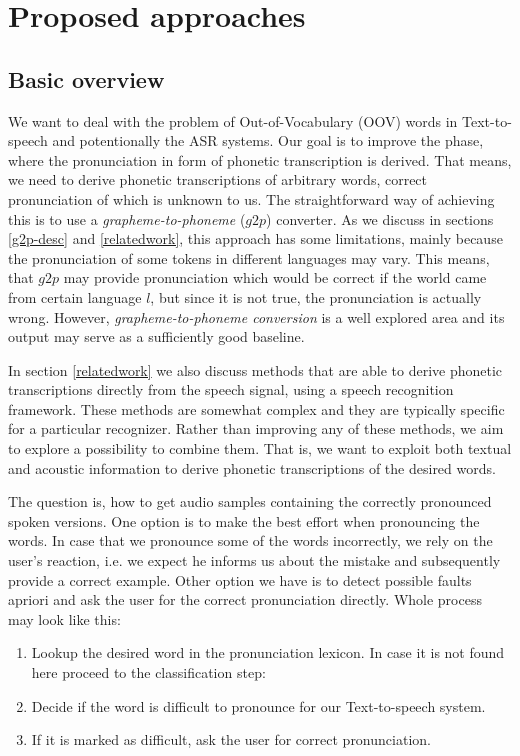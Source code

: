 \chapter{Proposed approaches}
\section{Basic overview}
\label{basover}
We want to deal with the problem of Out-of-Vocabulary (OOV) words in Text-to-speech and potentionally the ASR systems.
Our goal is to improve the phase, where the pronunciation in form of phonetic transcription is derived.
That means, we need to derive phonetic transcriptions of arbitrary words, correct pronunciation of which is unknown to us.
The straightforward way of achieving this is to use a \textit{grapheme-to-phoneme} ($g2p$) converter.
As we discuss in sections \ref{g2p-desc} and \ref{relatedwork}, this approach has some limitations, mainly because the pronunciation of some tokens in different languages may vary.
This means, that $g2p$ may provide pronunciation which would be correct if the world came from certain language $l$, but since it is not true, the pronunciation is actually wrong.
However, \textit{grapheme-to-phoneme conversion} is a well explored area and its output may serve as a sufficiently good baseline.
\par
In section \ref{relatedwork} we also discuss methods that are able to derive phonetic transcriptions directly from the speech signal, using a speech recognition framework. These methods are somewhat complex and they are typically specific for a particular recognizer. Rather than improving any of these methods, we aim to explore a possibility to combine them. That is, we want to exploit both textual and acoustic information to derive phonetic transcriptions of the desired words.
\par
\label{detection}
The question is, how to get audio samples containing the correctly pronounced spoken versions.
One option is to make the best effort when pronouncing the words.
In case that we pronounce some of the words incorrectly, we rely on the user's reaction, i.e. we expect he informs us about the mistake and subsequently provide a correct example.
Other option we have is to detect possible faults apriori and ask the user for the correct pronunciation directly.
Whole process may look like this:
\begin{enumerate}
\item Lookup the desired word in the pronunciation lexicon. In case it is not found here proceed to the classification step:
\item Decide if the word is difficult to pronounce for our Text-to-speech system.
\item If it is marked as difficult, ask the user for correct pronunciation.
\end{enumerate}
